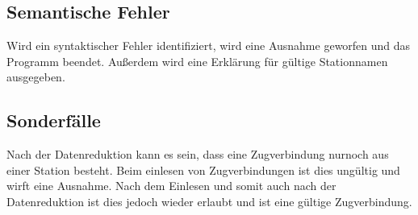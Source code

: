 \subsection{Semantische Fehler}\label{subsec:semantische-fehler-behandlung}
Wird ein syntaktischer Fehler identifiziert, wird eine Ausnahme geworfen und das Programm beendet. Außerdem wird eine Erklärung für gültige Stationnamen ausgegeben.


\subsection{Sonderfälle}\label{subsec:sonderfaelle}
Nach der Datenreduktion kann es sein, dass eine Zugverbindung nurnoch aus einer Station besteht. Beim einlesen von Zugverbindungen ist dies ungültig und wirft eine Ausnahme. Nach dem Einlesen und somit auch nach der Datenreduktion ist dies jedoch wieder erlaubt und ist eine gültige Zugverbindung.\\
